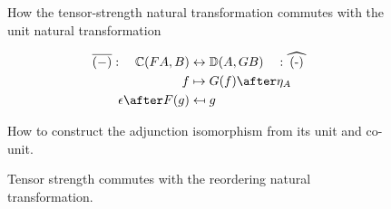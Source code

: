 \documentclass{Report}
\begin{document}
\begin{figure}
        \begin{minipage}{0.45\textwidth}
            \begin{framed}
            \end{framed}
            \caption{How the tensor-strength natural transformation commutes with the unit natural transformation}
            \label{TensorStrengthPoint}
        \end{minipage}
        \quad
        \begin{minipage}{0.45\textwidth}
            \begin{framed}
                \begin{align*}
                    \bar{(-)}: \quad\C(FA, B) &\leftrightarrow \DC(A, GB)   \quad: \widehat{(-)}\\
                    f & \mapsto G(f)\after\eta_A \\
                    \epsilon\after F(g) & \mapsfrom g
                \end{align*}
            \end{framed}
            \caption{How to construct the adjunction isomorphism from its unit and co-unit.}
            \label{Adjunction}
        \end{minipage}
\end{figure}



\begin{figure}
    \centering
    \begin{framed}
        \centering
    \end{framed}
    \caption{Tensor strength commutes with the reordering natural transformation.}
    \label{TensorStrengthAlpha}
\end{figure}
\end{document}
